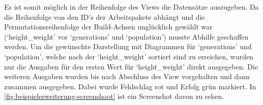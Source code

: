 Es ist somit möglich in der Reihenfolge des Views die Datensätze auszugeben.
Da die Reihenfolge von den ID's der Arbeitspakete abhängt
und die Permutationsreihenfolge der Build-Achsen unglücklich gewählt war (`height\_weight' vor `generations' und `population') musste Abhilfe geschaffen werden.
Um die gewünschte Darstellung mit Diagrammen für `generations' und `population', welche nach der `height\_weight' sortiert sind zu erreichen, wurden nur die Ausgaben für den ersten Wert für `height\_weight' direkt ausgegeben.
Die weiteren Ausgaben wurden bis nach Abschluss des View vorgehalten und dann zusammen ausgegeben.
Dabei wurde Fehlschlag rot und Erfolg grün markiert.
In \cref{fig:beispielerweiterung-screenshoot} ist ein Screenshot davon zu sehen.



